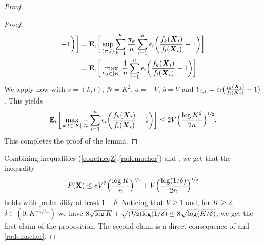 \begin{proof}
\begin{proof}
\begin{align}
		-1\bigg) \bigg]
		&= \mathbf E_{\epsilon}\bigg[ \sup_{(\boldsymbol \pi,l)} \sum_{k=1}^K \frac{\pi_k}{n}\sum_{i=1}^n \epsilon_i
		\bigg(\frac{f_{k}(\boldsymbol X_i)}{f_l(\boldsymbol X_i)} -1\bigg)  \bigg]\\
		&=\mathbf E_{\epsilon}\bigg[ \max_{k,l\in[K]} \frac{1}{n}\sum_{i=1}^n \epsilon_i
		\bigg(\frac{f_{k}(\boldsymbol X_i)}{f_l(\boldsymbol X_i)} -1\bigg) \bigg].
		\end{align}
		We apply now  with $s= (k,l)$, $N = K^2$, $a=-V$, $b= V$ and $Y_{i,s} = \epsilon_i
		\big(\frac{f_{k}(\boldsymbol X_i)}{f_l(\boldsymbol X_i)} -1\big)$. This yields
		\begin{align}
		\mathbf E_{\epsilon}\bigg[ \max_{k,l\in[K]}  \frac{1}{n}\sum_{i=1}^n \epsilon_i
		\bigg(\frac{f_{k}(\boldsymbol X_i)}{f_l(\boldsymbol X_i)} -1\bigg) \bigg]
		\le 2V \Big(\frac{\log K^2}{2n}\Big)^{\nicefrac12}.
		\end{align}
		This completes the proof of the lemma.
	\end{proof}
	Combining inequalities (\ref{concIneqZ},\ref{rademacher}) and , we get that the inequality
	\begin{equation}
	F(\mathbf X) \le 8V^3\Big(\frac{\log K}{n}\Big)^{\nicefrac12}+ V\Big(\frac{\log(1/\delta)}{2n}\Big)^{\nicefrac12}
	\end{equation}
	holds with probability at least $1-\delta$. Noticing that $V\ge 1$ and, for $K\ge 2$, $\delta\in(0,K^{-1/31})$
	we have $8\sqrt{\log K}+ \sqrt{(\nicefrac12){\log(1/\delta)}}\le 8\sqrt{\log(K/\delta)}$,
	we get the first claim of the proposition. The second claim is a direct consequence
	of  and \eqref{rademacher}.
\end{proof}


